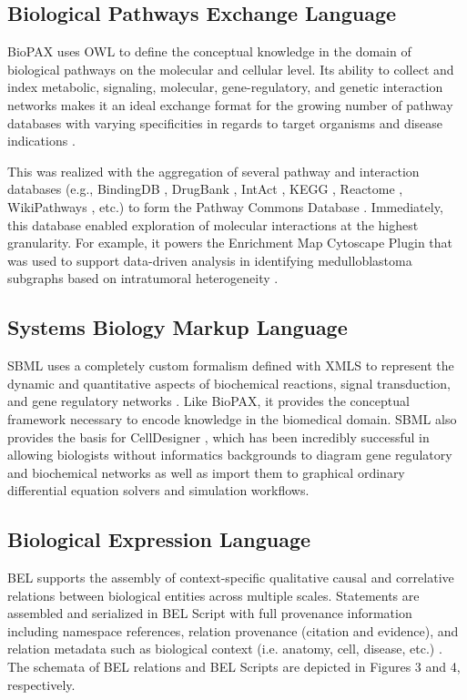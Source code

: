 \subsection{Biological Pathways Exchange Language}

\ac{BioPAX} uses \ac{OWL} to define the conceptual knowledge in the domain of biological pathways on the molecular and cellular level. Its ability to collect and index metabolic, signaling, molecular, gene-regulatory, and genetic interaction networks makes it an ideal exchange format for the growing number of pathway databases with varying specificities in regards to target organisms and disease indications \cite{Demir2010}.

This was realized with the aggregation of several pathway and interaction databases (e.g., BindingDB \cite{Gilson2016}, DrugBank \cite{Law2014}, IntAct \cite{Orchard2014}, \ac{KEGG} \cite{Kanehisa2017}, Reactome \cite{Fabregat2016}, WikiPathways \cite{Pico2008}, etc.) to form the Pathway Commons Database \cite{Cerami2011}. Immediately, this database enabled exploration of molecular interactions at the highest granularity. For example, it powers the Enrichment Map Cytoscape Plugin \cite{Merico2010} that was used to support data-driven analysis in identifying medulloblastoma subgraphs based on intratumoral heterogeneity \cite{Cavalli2017}.

\subsection{Systems Biology Markup Language}

\ac{SBML} uses a completely custom formalism defined with \ac{XMLS} to represent the dynamic and quantitative aspects of biochemical reactions, signal transduction, and gene regulatory networks \cite{Hucka2003}. Like \ac{BioPAX}, it provides the conceptual framework necessary to encode knowledge in the biomedical domain. \ac{SBML} also provides the basis for CellDesigner \cite{Funahashi2003}, which has been incredibly successful in allowing biologists without informatics backgrounds to diagram gene regulatory and biochemical networks as well as import them to graphical ordinary differential equation solvers and simulation workflows. 

\subsection{Biological Expression Language}

\ac{BEL} supports the assembly of context-specific qualitative causal and correlative relations between biological entities across multiple scales. Statements are assembled and serialized in \ac{BEL} Script with full provenance information including namespace references, relation provenance (citation and evidence), and relation metadata such as  biological context (i.e. anatomy, cell, disease, etc.) \cite{Slater2014}. The schemata of BEL relations and BEL Scripts are depicted in Figures 3 and 4, respectively.

